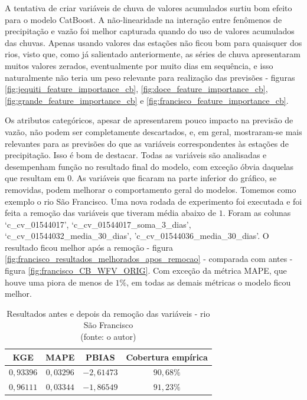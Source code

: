 A tentativa de criar variáveis de chuva de valores acumulados surtiu bom efeito para o modelo CatBoost. A não-linearidade na interação entre fenômenos de precipitação e vazão foi melhor capturada quando do uso de valores acumulados das chuvas. Apenas usando valores das estações não ficou bom para quaisquer dos rios, visto que, como já salientado anteriormente, as séries de chuva apresentaram muitos valores zerados, eventualmente por muito dias em sequência, e isso naturalmente não teria um peso relevante para realização das previsões - figuras \ref{fig:jequiti_feature_importance_cb}, \ref{fig:doce_feature_importance_cb}, \ref{fig:grande_feature_importance_cb} e \ref{fig:francisco_feature_importance_cb}.

Os atributos categóricos, apesar de apresentarem pouco impacto na previsão de vazão, não podem ser completamente descartados, e, em geral, mostraram-se mais relevantes para as previsões do que as variáveis correspondentes às estações de precipitação. Isso é bom de destacar. Todas as variáveis são analisadas e desempenham função no resultado final do modelo, com exceção óbvia daquelas que resultam em $0$. As variáveis que ficaram na parte inferior do gráfico, se removidas, podem melhorar o comportamento geral do modelos. Tomemos como exemplo o rio São Francisco. Uma nova rodada de experimento foi executada e foi feita a remoção das variáveis que tiveram média abaixo de $1$. Foram as colunas `c\_cv\_01544017', `c\_cv\_01544017\_soma\_3\_dias', `c\_cv\_01544032\_media\_30\_dias', 'c\_cv\_01544036\_media\_30\_dias'. O resultado ficou melhor após a remoção - figura \ref{fig:francisco_resultados_melhorados_apos_remocao} - comparada com antes - figura \ref{fig:francisco_CB_WFV_ORIG}. Com exceção da métrica MAPE, que houve uma piora de menos de $1\%$, em todas as demais métricas o modelo ficou melhor.

\begin{table}[!h]
\centering \small
\caption{Resultados antes e depois da remoção das variáveis - rio São Francisco\\(fonte: o autor)}
\begin{tabular}{|c|c|c|c|} \hline 
	\textbf{KGE} & \textbf{MAPE} & \textbf{PBIAS} & \textbf{Cobertura empírica} \\\hline
	$0,93396$    & $0,03296$     & $-2,61473$     & $90,68\%$\\\hline
	$0,96111$    & $0,03344$     & $-1,86549$     & $91,23\%$\\\hline
\end{tabular}
\label{tab:comparacao_resultados_sao_francisco}
\end{table}

